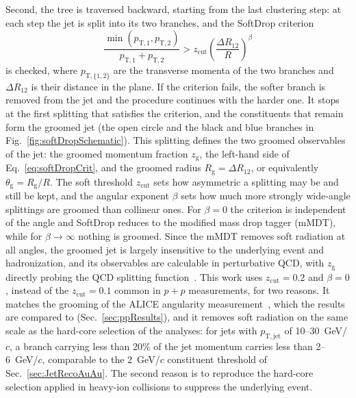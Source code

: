 Second, the tree is traversed backward, starting from the last clustering step: at each step the jet is split into its two branches, and the SoftDrop criterion
\begin{equation}
	\label{eq:softDropCrit}
	\frac{\min(p_\mathrm{T,1}, p_\mathrm{T, 2})}{p_\mathrm{T,1} + p_\mathrm{T, 2}} > z_\mathrm{cut} \left(\frac{\Delta R_{12}}{R}\right)^\beta
\end{equation}
is checked, where \(p_\mathrm{T, \{1,2\}}\) are the transverse momenta of the two branches and \(\Delta R_{12}\) is their distance in the \etaphi plane.
%
If the criterion fails, the softer branch is removed from the jet and the procedure continues with the harder one.
%
It stops at the first splitting that satisfies the criterion, and the constituents that remain form the groomed jet (the open circle and the black and blue branches in Fig.~\ref{fig:softDropSchematic}).
%
This splitting defines the two groomed observables of the jet: the groomed momentum fraction \(z_\mathrm{g}\), the left-hand side of Eq.~\ref{eq:softDropCrit}, and the groomed radius \(R_\mathrm{g} = \Delta R_{12}\), or equivalently \(\theta_\mathrm{g} = R_\mathrm{g}/R\).
%
The soft threshold \(z_\mathrm{cut}\) sets how asymmetric a splitting may be and still be kept, and the angular exponent \(\beta\) sets how much more strongly wide-angle splittings are groomed than collinear ones.
%
For \(\beta = 0\) the criterion is independent of the angle and SoftDrop reduces to the modified mass drop tagger (mMDT), while for \(\beta \to \infty\) nothing is groomed.
%
Since the mMDT removes soft radiation at all angles, the groomed jet is largely insensitive to the underlying event and hadronization, and its observables are calculable in perturbative QCD, with \(z_\mathrm{g}\) directly probing the QCD splitting function~\cite{Dasgupta_2013,SoftDrop_Larkoski_2014}.
%
This work uses \(z_\mathrm{cut} = 0.2\) and \(\beta = 0\), instead of the \(z_\mathrm{cut} = 0.1\) common in \(p+p\) measurements, for two reasons.
%
It matches the grooming of the ALICE angularity measurement~\cite{ALICE:2021njq}, which the results are compared to (Sec.~\ref{sec:ppResults}), and it removes soft radiation on the same scale as the hard-core selection of the \AuAu analyses: for jets with \(p_\mathrm{T, jet}\) of 10--30~GeV/\(c\), a branch carrying less than 20\% of the jet momentum carries less than 2--6~GeV/\(c\), comparable to the 2~GeV/\(c\) constituent threshold of Sec.~\ref{sec:JetRecoAuAu}.
%
The second reason is to reproduce the hard-core selection applied in heavy-ion collisions to suppress the underlying event.

